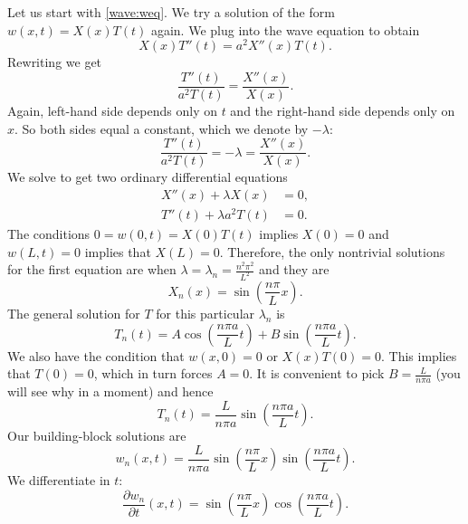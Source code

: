 \documentclass{ximera}
\begin{document}
Let us start with \eqref{wave:weq}. We try a solution of the form $w(x,t) = X(x) T(t)$ again.  We plug into the wave equation to obtain
\begin{equation*}
    X(x)T''(t) = a^2 X''(x) T(t) .
\end{equation*}
Rewriting we get
\begin{equation*}
    \frac{T''(t)}{a^2 T(t)} = \frac{X''(x)}{X(x)} .
\end{equation*}
Again, left-hand side depends only on $t$ and the right-hand side depends only on $x$.  So both sides equal a constant, which we denote by $-\lambda$:
\begin{equation*}
    \frac{T''(t)}{a^2 T(t)} = -\lambda = \frac{X''(x)}{X(x)} .
\end{equation*}
We solve to get two ordinary differential equations
\begin{align*}
    X''(x) + \lambda X(x) &= 0 , \\
    T''(t) + \lambda a^2 T(t) &= 0 .
\end{align*}
The conditions $0 = w(0,t) = X(0) T(t)$ implies $X(0) = 0$ and $w(L,t) = 0$ implies that $X(L) = 0$.  Therefore, the only nontrivial solutions for the first equation are when $\lambda = \lambda_n = \frac{n^2 \pi^2}{L^2}$ and they are
\begin{equation*}
    X_n(x) = \sin \left( \frac{n \pi}{L} x \right) .
\end{equation*}
The general solution for $T$ for this particular $\lambda_n$ is
\begin{equation*}
    T_n(t) = A \cos \left( \frac{n \pi a}{L} t \right) + B \sin \left( \frac{n \pi a}{L} t \right).
\end{equation*}
We also have the condition that $w(x,0) = 0$ or $X(x)T(0) = 0$.  This implies that $T(0) = 0$, which in turn forces $A = 0$.  It is convenient to pick $B=\frac{L}{n \pi a}$ (you will see why in a moment) and hence
\begin{equation*}
    T_n(t) = \frac{L}{n \pi a} \sin \left( \frac{n \pi a}{L} t \right).
\end{equation*}
Our building-block solutions are
\begin{equation*}
    w_n(x,t) = \frac{L}{n \pi a} \sin \left( \frac{n \pi}{L} x \right) \sin \left( \frac{n \pi a}{L} t \right) .
\end{equation*}
We differentiate in $t$:
\begin{equation*}
    \frac{\partial w_n}{\partial t}(x,t) = \sin \left( \frac{n \pi}{L} x \right) \cos \left( \frac{n \pi a}{L} t \right) .
\end{equation*}
\end{document}
